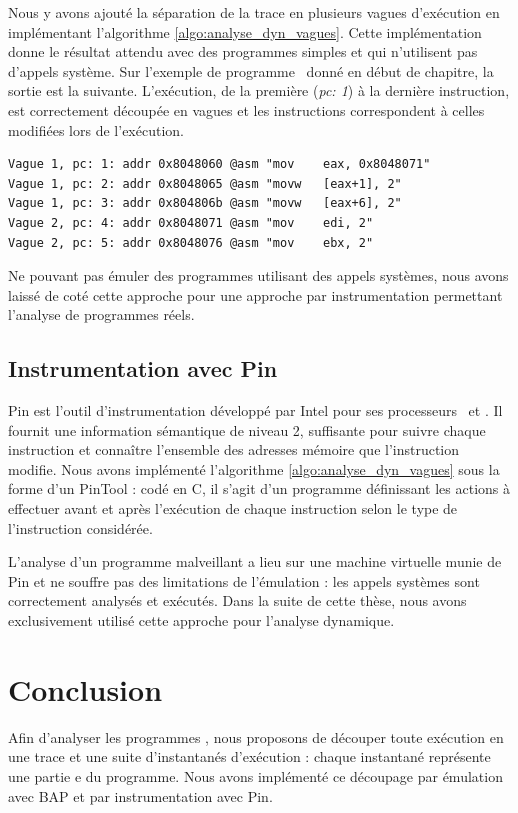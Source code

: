 Nous y avons ajouté la séparation de la trace en plusieurs vagues d'exécution en implémentant l'algorithme \ref{algo:analyse_dyn_vagues}.
Cette implémentation donne le résultat attendu avec des programmes simples et qui n'utilisent pas d'appels système.
Sur l'exemple de programme \sm\ donné en début de chapitre, la sortie est la suivante.
L'exécution, de la première (\emph{pc: 1}) à la dernière instruction, est correctement découpée en vagues et les instructions correspondent à celles modifiées lors de l'exécution.

\begin{center}
\begin{verbatim}
Vague 1, pc: 1: addr 0x8048060 @asm "mov    eax, 0x8048071"
Vague 1, pc: 2: addr 0x8048065 @asm "movw   [eax+1], 2"
Vague 1, pc: 3: addr 0x804806b @asm "movw   [eax+6], 2"
Vague 2, pc: 4: addr 0x8048071 @asm "mov    edi, 2"
Vague 2, pc: 5: addr 0x8048076 @asm "mov    ebx, 2"
\end{verbatim}
\end{center}

Ne pouvant pas émuler des programmes utilisant des appels systèmes, nous avons laissé de coté cette approche pour une approche par instrumentation permettant l'analyse de programmes réels.


\subsection{Instrumentation avec Pin}
Pin est l'outil d'instrumentation développé par Intel pour ses processeurs \xq\ et \xs.
Il fournit une information sémantique de niveau 2, suffisante pour suivre chaque instruction et connaître l'ensemble des adresses mémoire que l'instruction modifie.
Nous avons implémenté l'algorithme \ref{algo:analyse_dyn_vagues} sous la forme d'un PinTool : codé en C, il s'agit d'un programme définissant les actions à effectuer avant et après l'exécution de chaque instruction selon le type de l'instruction considérée.

L'analyse d'un programme malveillant a lieu sur une machine virtuelle munie de Pin et ne souffre pas des limitations de l'émulation : les appels systèmes sont correctement analysés et exécutés. 
Dans la suite de cette thèse, nous avons exclusivement utilisé cette approche pour l'analyse dynamique.

\section*{Conclusion}
Afin d'analyser les programmes \sms, nous proposons de découper toute exécution en une trace et une suite d'instantanés d'exécution : chaque instantané représente une partie \nsm e du programme.
Nous avons implémenté ce découpage par émulation avec BAP et par instrumentation avec Pin.

